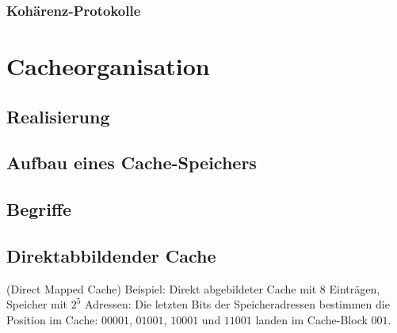 \subsubsection{Kohärenz-Protokolle}

\section{Cacheorganisation}

\subsection{Realisierung}

\subsection{Aufbau eines Cache-Speichers}

\subsection{Begriffe}

\subsection{Direktabbildender Cache}
(Direct Mapped Cache)
Beispiel: Direkt abgebildeter Cache mit 8 Einträgen, Speicher mit $2^5$ Adressen: Die letzten Bits der Speicheradressen bestimmen die Position im Cache: $00001$, $01001$, $10001$ und $11001$ landen im Cache-Block $001$.

